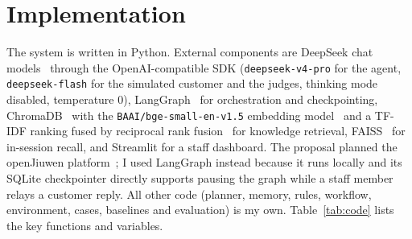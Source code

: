 \documentclass[12pt,a4paper]{article}
\newcommand{\code}[1]{\texttt{\small #1}}
\begin{document}
\section{Implementation}
The system is written in Python. External components are DeepSeek chat models~\cite{deepseek} through the
OpenAI-compatible SDK (\code{deepseek-v4-pro} for the agent, \code{deepseek-flash} for the simulated customer and the
judges, thinking mode disabled, temperature 0), LangGraph~\cite{langgraph} for orchestration and checkpointing,
ChromaDB~\cite{chroma} with the \code{BAAI/bge-small-en-v1.5} embedding model~\cite{bge} and a TF-IDF ranking fused by
reciprocal rank fusion~\cite{rrf} for knowledge retrieval, FAISS~\cite{faiss} for in-session recall, and Streamlit for
a staff dashboard. The proposal planned the openJiuwen platform~\cite{openjiuwen}; I used LangGraph instead because it
runs locally and its SQLite checkpointer directly supports pausing the graph while a staff member relays a customer
reply. All other code (planner, memory, rules, workflow, environment, cases, baselines and evaluation) is my own.
Table~\ref{tab:code} lists the key functions and variables.
\end{document}
